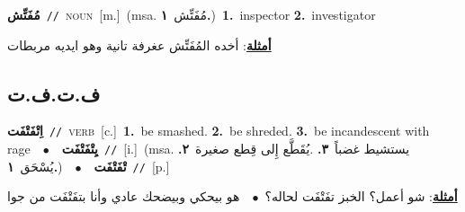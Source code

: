 \documentclass[10pt,a4paper,twoside]{article} %
\begin{document}
\begin{multicols}{2}
{{{{{{\setlength\topsep{0pt}\textbf{\foreignlanguage{arabic}{مُفَتِّش}}\ {\color{gray}\texttt{//}\color{black}}\ \textsc{noun}\ [m.]\ \color{gray}(msa. \foreignlanguage{arabic}{مُفَتِّش}~\foreignlanguage{arabic}{\textbf{١.}})\color{black}\ \textbf{1.}~inspector  \textbf{2.}~investigator\  \begin{flushright}\color{gray}\foreignlanguage{arabic}{\textbf{\underline{\foreignlanguage{arabic}{أمثلة}}}: أخده المُفَتِّش عغرفة تانية وهو ايديه مربطات}\end{flushright}\color{black}} \vspace{2mm}

\vspace{-3mm}
\subsection*{\color{blue}\foreignlanguage{arabic}{ف.ت.ف.ت}\color{blue}{}} 

{\setlength\topsep{0pt}\textbf{\foreignlanguage{arabic}{اِتْفَتْفَت}}\ {\color{gray}\texttt{//}\color{black}}\ \textsc{verb}\ [c.]\ \textbf{1.}~be smashed.  \textbf{2.}~be shreded.  \textbf{3.}~be incandescent with rage\ \ $\bullet$\ \ \setlength\topsep{0pt}\textbf{\foreignlanguage{arabic}{يِتْفَتْفَت}}\ {\color{gray}\texttt{//}\color{black}}\ [i.]\ \color{gray}(msa. \foreignlanguage{arabic}{يستشيط غضباً}~\foreignlanguage{arabic}{\textbf{٣.}}  .\foreignlanguage{arabic}{يُقَطَّع إِلى قِطع صغيرة}~\foreignlanguage{arabic}{\textbf{٢.}}  \foreignlanguage{arabic}{يُسْحَق}~\foreignlanguage{arabic}{\textbf{١.}})\color{black}\ \ $\bullet$\ \ \setlength\topsep{0pt}\textbf{\foreignlanguage{arabic}{تْفَتْفَت}}\ {\color{gray}\texttt{//}\color{black}}\ [p.]\  \begin{flushright}\color{gray}\foreignlanguage{arabic}{\textbf{\underline{\foreignlanguage{arabic}{أمثلة}}}: شو أعمل؟ الخبز تفَتْفَت لحاله؟\ $\bullet$\ \  هو بيحكي وبيضحك عادي وأنا بتفَتْفَت من جوا}\end{flushright}\color{black}} \vspace{2mm}

}}}}}
\end{multicols}
\end{document}
